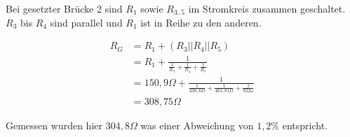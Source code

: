 \documentclass[
a4paper,     %
 headsepline, %
11pt         %
]{scrartcl}  %
\begin{document}
Bei gesetzter Brücke 2 sind $R_1$ sowie $R_{3..5} $ im Stromkreis zusammen geschaltet. $R_3$ bis $R_4$ sind parallel und $R_1$ ist in Reihe zu den anderen.

\begin{align}
R_G &= R_1 + (R_3 || R_4 || R_5) \nonumber \\
	&= R_1 + \frac{1}{\frac{1}{R_3}+\frac{1}{R_4}+\frac{1}{R_5}} \nonumber \\
	&= 150,9 \Omega + \frac{1}{\frac{1}{338,6\Omega}+\frac{1}{461,81\Omega}+\frac{1}{822\omega}} \nonumber \\
	&= 308,75\Omega \nonumber
\end{align}

Gemessen wurden hier $304,8 \Omega$ was einer Abweichung von $1,2\%$ entspricht.

\newpage
\end{document}
